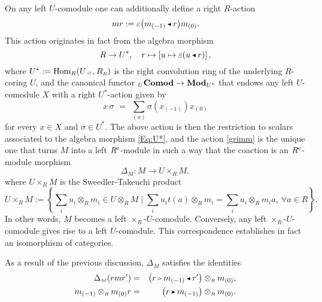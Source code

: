 \documentclass[reqno, a4paper, 10pt]{amsart}
\numberwithin{equation}{section}
\theoremstyle{plain}
\theoremstyle{definition}
\theoremstyle{remark}
\begin{document}
\noindent On any left $U$-comodule
one can additionally define 
a right $R$-action 
\begin{equation}
\label{grimm}
mr := \varepsilon\big(m_{(-1)}{{\,\raise1pt\hbox{$\scriptscriptstyle{\blacktriangleleft}$} \, }} r\big)m_{(0)}.
\end{equation}
This action originates in fact from the algebra morphism
\begin{equation}
\label{Eq:U*}
 R \to U^*, \quad
 r \mapsto \left[u \mapsto \varepsilon(u{{\,\raise1pt\hbox{$\scriptscriptstyle{\blacktriangleleft}$} \, }} r) \right],
\end{equation}
where $U^*:={\operatorname{Hom}}_{R}(U_{{\,\raise1pt\hbox{$\scriptscriptstyle{\lhd}$} \, }},R_{{\scriptscriptstyle{R}}})$ is the right convolution ring of the underlying $R$-coring $U$, and the canonical functor ${}_U{\bf Comod} \to {\mathbf{Mod}}_{U^*}$ that endows any left $U$-comodule $X$ with a right $U^*$-action  given  by 
$$
x\, \sigma \,\, =\,\, \sum_{(x)} \sigma(x_{(-1)}) x_{(0)}
$$
for every $x \in X$ and $\sigma \in U^*$. 
The above action is then the restriction to scalars associated to the algebra morphism \eqref{Eq:U*}, 
and the action \eqref{grimm} is the unique one that turns $M$ into a left
${{R^{\rm e}}}$-module in such a way that the coaction is an
${{R^{\rm e}}}$-module morphism
$$
		  {\Delta}_{{\scriptscriptstyle{M}}}: M \to U \times_{{\scriptscriptstyle{R}}} M, 
$$
where $U \times_{{\scriptscriptstyle{R}}} M$ is the Sweedler-Takeuchi product
$$
U \times_{{\scriptscriptstyle{R}}} M := \left\{\underset{}{} \textstyle\sum_i u_i \otimes_{{\scriptscriptstyle{R}}} m_i		 
		  \in U \otimes_{{\scriptscriptstyle{R}}} M \mid
		  \sum_i u_i{t} (a) \otimes_{{\scriptscriptstyle{R}}} m_i
		  = \sum_i u_i \otimes_{{\scriptscriptstyle{R}}} m_i a, \
		  \forall a \in R\right\}.
$$
In other words, $M$ becomes  a left  $\times_R$-$U$-comodule. Conversely, any left $\times_R$-$U$-comodule gives rise to a left $U$-comodule. This correspondence establishes  in fact an isomorphism of categories.

As a result of the previous discussion, $\Delta_{{\scriptscriptstyle{M}}}$ satisfies the identities 
\begin{eqnarray}
\label{maotsetung}
		  {\Delta}_{{\scriptscriptstyle{M}}}(rmr') &=& 
		  {\big( {r {{\,\raise1pt\hbox{$\scriptscriptstyle{\rhd}$} \, }}  m_{(-1)} {{\,\raise1pt\hbox{$\scriptscriptstyle{\blacktriangleleft}$} \, }} r'} \big)} \otimes_{{\scriptscriptstyle{R}}}
		  m_{(0)}, \\
		  \label{douceuretresistance}
		  m_{(-1)} \otimes_{{\scriptscriptstyle{R}}} m_{(0)}r
		  &=&  
		 {\big( { r {{\,\raise1pt\hbox{$\scriptscriptstyle{\blacktriangleright}$} \, }} m_{(-1)}} \big)}  \otimes_{{\scriptscriptstyle{R}}} m_{(0)}.
\end{eqnarray}
\end{document}
